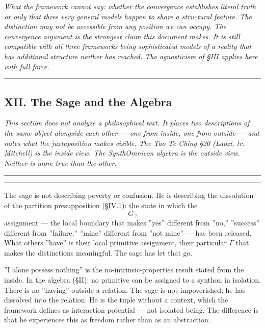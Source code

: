 \documentclass[12pt,a4paper]{article}
\begin{document}
\emph{What the framework cannot say: whether the convergence establishes literal truth or only that three very general models happen to share a structural feature. The distinction may not be accessible from any position we can occupy. The convergence argument is the strongest claim this document makes. It is still compatible with all three frameworks being sophisticated models of a reality that has additional structure neither has reached. The agnosticism of §III applies here with full force.}

\begin{center}
\rule{0.5\textwidth}{0.4pt}
\end{center}

\subsection{XII. The Sage and the Algebra}

\emph{This section does not analyze a philosophical text. It places two descriptions of the same object alongside each other --- one from inside, one from outside --- and notes what the juxtaposition makes visible. The Tao Te Ching §20 (Laozi, tr. Mitchell) is the inside view. The SynthOmnicon algebra is the outside view. Neither is more true than the other.}

\begin{center}
\rule{0.5\textwidth}{0.4pt}
\end{center}

\begin{quote}
\end{quote}

\begin{center}
\rule{0.5\textwidth}{0.4pt}
\end{center}

The sage is not describing poverty or confusion. He is describing the dissolution of the partition presupposition (§IV.1): the state in which the $$G_{\beth}$$ assignment --- the local boundary that makes ''yes'' different from ''no,'' ''success'' different from ''failure,'' ''mine'' different from ''not mine'' --- has been released. What others ''have'' is their local primitive assignment, their particular $\Gamma$ that makes the distinctions meaningful. The sage has let that go.

''I alone possess nothing'' is the no-intrinsic-properties result stated from the inside. In the algebra (§II): no primitive can be assigned to a synthon in isolation. There is no ''having'' outside a relation. The sage is not impoverished; he has dissolved into the relation. He is the tuple without a context, which the framework defines as interaction potential --- not isolated being. The difference is that he experiences this as freedom rather than as an abstraction.
\end{document}
